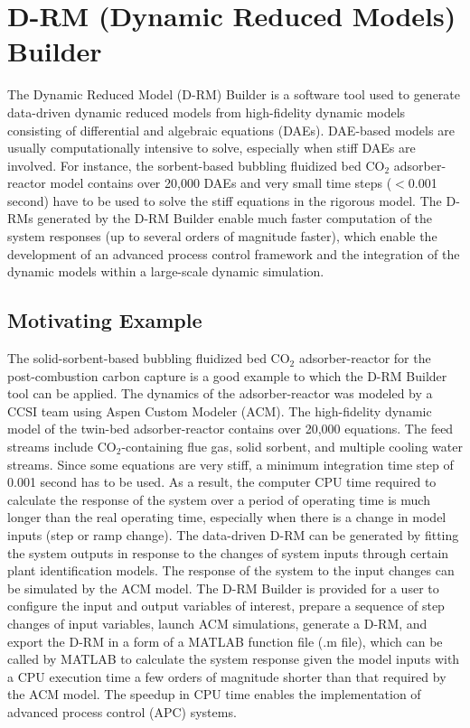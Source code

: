 \section{D-RM (Dynamic Reduced Models) Builder}\label{sec.overview.drm}

The Dynamic Reduced Model (D-RM) Builder is a software tool used to generate data-driven dynamic reduced models from high-fidelity dynamic models consisting of differential and algebraic equations (DAEs).  DAE-based models are usually computationally intensive to solve, especially when stiff DAEs are involved.  For instance, the sorbent-based bubbling fluidized bed CO$_2$ adsorber-reactor model contains over 20,000 DAEs and very small time steps ($<$0.001 second) have to be used to solve the stiff equations in the rigorous model.  The D-RMs generated by the D-RM Builder enable much faster computation of the system responses (up to several orders of magnitude faster), which enable the development of an advanced process control framework and the integration of the dynamic models within a large-scale dynamic simulation.

\subsection{Motivating Example}

The solid-sorbent-based bubbling fluidized bed CO$_2$ adsorber-reactor for the post-combustion carbon capture is a good example to which the D-RM Builder tool can be applied.  The dynamics of the adsorber-reactor was modeled by a CCSI team using Aspen Custom Modeler (ACM).  The high-fidelity dynamic model of the twin-bed adsorber-reactor contains over 20,000 equations.  The feed streams include CO$_2$-containing flue gas, solid sorbent, and multiple cooling water streams.  Since some equations are very stiff, a minimum integration time step of 0.001 second has to be used.  As a result, the computer CPU time required to calculate the response of the system over a period of operating time is much longer than the real operating time, especially when there is a change in model inputs (step or ramp change).  The data-driven D-RM can be generated by fitting the system outputs in response to the changes of system inputs through certain plant identification models.  The response of the system to the input changes can be simulated by the ACM model.  The D-RM Builder is provided for a user to configure the input and output variables of interest, prepare a sequence of step changes of input variables, launch ACM simulations, generate a D-RM, and export the D-RM in a form of a MATLAB function file (.m file), which can be called by MATLAB to calculate the system response given the model inputs with a CPU execution time a few orders of magnitude shorter than that required by the ACM model.  The speedup in CPU time enables the implementation of advanced process control (APC) systems.

